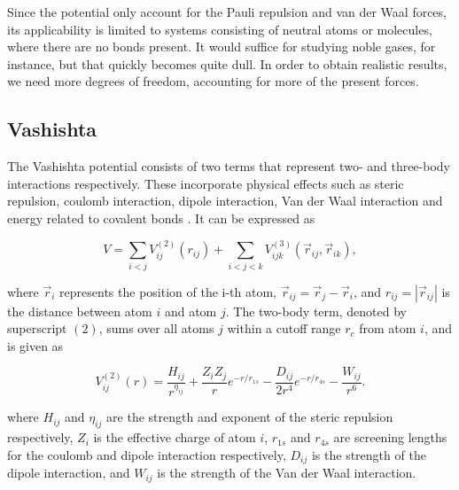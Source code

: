 \documentclass[twoside,english]{uiofysmaster}
\begin{document}
\begin{figure}[H]
\end{figure}

Since the potential only account for the Pauli repulsion and van der Waal forces, its applicability is limited to systems consisting of neutral atoms or molecules, where there are no bonds present. 
It would suffice for studying noble gases, for instance, but that quickly becomes quite dull. 
In order to obtain realistic results, we need more degrees of freedom, accounting for more of the present forces. 

 

\subsection{Vashishta}
The Vashishta potential consists of two terms that represent two- and three-body interactions respectively. These incorporate physical effects such as steric repulsion, coulomb interaction, dipole interaction, Van der Waal interaction and energy related to covalent bonds \cite{Vashishta1990}. It can be expressed as

\begin{equation}
V = \sum_{i<j} V_{ij}^{(2)}(r_{ij}) + \sum_{i<j<k} V_{ijk}^{(3)}(\vec{r}_{ij}, \vec{r}_{ik}) , \label{vashistaTwoTerm}
\end{equation}

\noindent
where $\vec{r}_i$ represents the position of the i-th atom, $\vec{r}_{ij} = \vec{r}_j - \vec{r}_i$, and $r_{ij} = |\vec{r}_{ij}|$ is the distance between atom $i$ and atom $j$.
The two-body term, denoted by superscript $(2)$, sums over all atoms $j$ within a cutoff range $r_c$ from atom $i$, and is given as

\begin{equation}
	 V_{ij}^{(2)}(r) = 
	 \frac{H_{ij}}{\displaystyle r^{\eta_{ij}}} +
	 \frac{Z_iZ_j}{r}e^{-r/r_{1s}} -
	 \frac{D_{ij}}{2r^4}e^{-r/r_{4s}} - 
	 \frac{W_{ij}}{r^6}.
\end{equation}

\noindent 
where $H_{ij}$ and $\eta_{ij}$ are the strength and exponent of the steric repulsion respectively, $Z_i$ is the effective charge of atom $i$, $r_{1s}$ and $r_{4s}$ are screening lengths for the coulomb and dipole interaction respectively, $D_{ij}$ is the strength of the dipole interaction, and $W_{ij}$ is the strength of the Van der Waal interaction.
\end{document}
